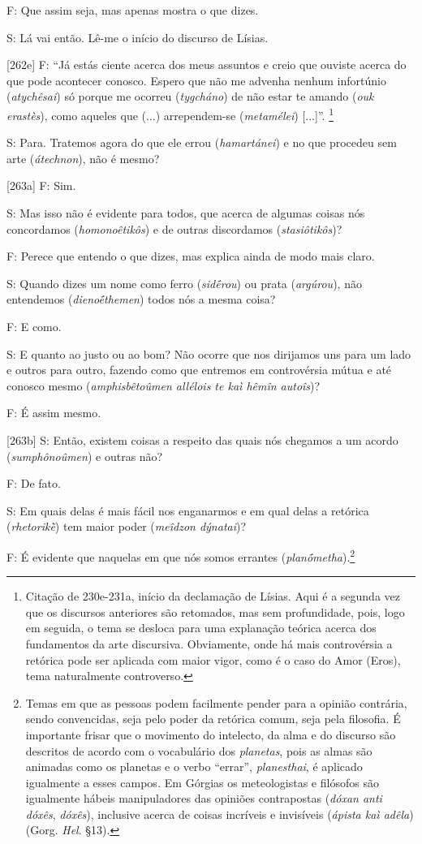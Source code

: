 F: Que assim seja, mas apenas mostra o que dizes.

S: Lá vai então. Lê-me o início do discurso de Lísias.

{[}262e{]} F: ``Já estás ciente acerca dos meus assuntos e creio que
ouviste acerca do que pode acontecer conosco. Espero que não me advenha
nenhum infortúnio (\emph{atychêsai}) só porque me ocorreu
(\emph{tygcháno}) de não estar te amando (\emph{ouk} \emph{erastès}),
como aqueles que (...) arrependem-se (\emph{metamélei}) {[}...{]}''.
\footnote{Citação de 230e-231a, início da declamação de Lísias. Aqui é a
  segunda vez que os discursos anteriores são retomados, mas sem
  profundidade, pois, logo em seguida, o tema se desloca para uma
  explanação teórica acerca dos fundamentos da arte discursiva.
  Obviamente, onde há mais controvérsia a retórica pode ser aplicada com
  maior vigor, como é o caso do Amor (Eros), tema naturalmente
  controverso.}

S: Para. Tratemos agora do que ele errou (\emph{hamartánei}) e no que
procedeu sem arte (\emph{átechnon}), não é mesmo?

{[}263a{]} F: Sim.

S: Mas isso não é evidente para todos, que acerca de algumas coisas nós
concordamos (\emph{homonoêtikôs}) e de outras discordamos
(\emph{stasiôtikôs})?

F: Perece que entendo o que dizes, mas explica ainda de modo mais claro.

S: Quando dizes um nome como ferro (\emph{sidḗrou}) ou prata
(\emph{argúrou}), não entendemos (\emph{dienoḗthemen}) todos nós a mesma
coisa?

F: E como.

S: E quanto ao justo ou ao bom? Não ocorre que nos dirijamos uns para um
lado e outros para outro, fazendo como que entremos em controvérsia
mútua e até conosco mesmo (\emph{amphisbêtoûmen allélois te kaì hêmîn
autoîs})?

F: É assim mesmo.

{[}263b{]} S: Então, existem coisas a respeito das quais nós chegamos a
um acordo (\emph{sumphônoûmen}) e outras não?

F: De fato.

S: Em quais delas é mais fácil nos enganarmos e em qual delas a retórica
(\emph{rhetorikḕ}) tem maior poder (\emph{meîdzon dýnatai})?

F: É evidente que naquelas em que nós somos errantes
(\emph{planṓmetha}).\footnote{Temas em que as pessoas podem facilmente
  pender para a opinião contrária, sendo convencidas, seja pelo poder da
  retórica comum, seja pela filosofia. É importante frisar que o
  movimento do intelecto, da alma e do discurso são descritos de acordo
  com o vocabulário dos \emph{planetas}, pois as almas são animadas como
  os planetas e o verbo ``errar'', \emph{planesthai}, é aplicado
  igualmente a esses campos\emph{.} Em Górgias os meteologistas e
  filósofos são igualmente hábeis manipuladores das opiniões
  contrapostas (\emph{dóxan anti dóxês}, \emph{dóxês}), inclusive acerca
  de coisas incríveis e invisíveis (\emph{ápista kaì adêla}) (Gorg.
  \emph{Hel}. §13).}

